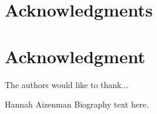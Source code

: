 \documentclass[10pt,journal,compsoc]{IEEEtran}
\theoremstyle{definition}
\theoremstyle{remark}
\begin{document}
  \section*{Acknowledgments}
\else
  \section*{Acknowledgment}
\fi


The authors would like to thank...


\ifCLASSOPTIONcaptionsoff
  \newpage
\fi








\begin{IEEEbiographynophoto}{Hannah Aizenman}
Biography text here.
\end{IEEEbiographynophoto}
\end{document}
